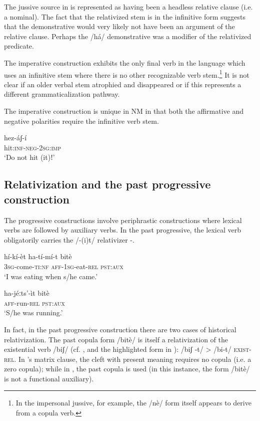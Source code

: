 \documentclass[output=paper]{langsci/langscibook}
\begin{document}
The jussive source in  is represented as having been a headless relative clause (i.e. a nominal). The fact that the relativized stem is in the infinitive form suggests that the demonstrative would very likely not have been an argument of the relative clause. Perhaps the /há/ demonstrative was a modifier of the relativized predicate.

The imperative construction exhibits the only final verb in the language which uses an infinitive stem where there is no other recognizable verb stem.\footnote{ In the impersonal jussive, for example, the /nè/ form itself appears to derive from a copula verb.} It is not clear if an older verbal stem atrophied and disappeared or if this represents a different grammaticalization pathway. 

The imperative construction  is unique in NM in that both the affirmative and negative polarities require the infinitive verb stem.  

\ea\label{ex:mahland:66}
\gll hez-áʃ-í\\
hit:\textsc{inf-neg-2sg:imp}\\
\glt `Do not hit (it)ǃ'
\z

\subsection{Relativization and the past progressive construction}\label{sec:mahland:3.2}

The progressive constructions involve periphrastic constructions where lexical verbs are followed by auxiliary verbs. In the past progressive, the lexical verb obligatorily carries the /-(i)t/ relativizer -.

\ea\label{ex:mahland:67}
\gll hí-kí-èt                 ha-tí-mí-t          bitè\\
\textsc{3sg}{}-come-\textsc{ti:nf}   \textsc{aff-1sg}{}-eat-\textsc{rel}   \textsc{pst:aux} \\
\glt `I was eating when s/he came.'
\z

\ea\label{ex:mahland:68}
\gll ha-jéːts'-ìt    bitè\\
\textsc{aff}{}-run-\textsc{rel}   \textsc{pst:aux}\\
\glt `S/he was running.'
\z

In fact, in the past progressive construction there are two cases of historical relativization. The past copula form /bitè/ is itself a relativization of the existential verb /biʃ/ (cf. \citealt[318; 461-462]{AhlandM2012}, and the highlighted form in ): /biʃ -t/ {>} /bi-t/ \textsc{exist-rel}. In 's matrix clause, the cleft with present meaning requires no copula (i.e. a zero copula); while in , the past copula is used (in this instance, the form /bitè/ is not a functional auxiliary). 
\end{document}
